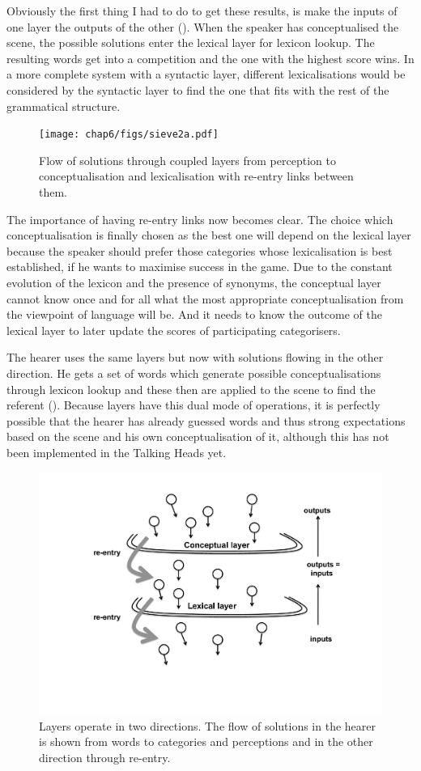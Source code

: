 Obviously the first thing I had to do to get 
these results, is make the inputs of one layer the
outputs of the other (). When the 
speaker has conceptualised the scene, the possible
solutions enter the lexical layer for lexicon lookup. 
The resulting words get into a competition and the 
one with the highest score wins. In a more complete
system with a syntactic layer, different lexicalisations
would be considered by the syntactic layer to find 
the one that fits with the rest of the grammatical 
structure. 


\begin{figure}[htbp]
  \centerline{\texttt{[image: chap6/figs/sieve2a.pdf]}}
\caption{\label{sieve2a}Flow of solutions through 
coupled layers from perception to conceptualisation and lexicalisation with re-entry links between them.} 
\end{figure}

The importance of having re-entry links now becomes
clear. The choice which conceptualisation is finally chosen 
as the best one will depend on the lexical layer because 
the speaker should prefer those categories whose 
lexicalisation is best established, if he wants to 
maximise success in the game. Due to the constant evolution
of the lexicon and the presence of synonyms, the conceptual
layer cannot know once and for all what the most
appropriate conceptualisation from the viewpoint of 
language will be. And it needs to know the outcome of the
lexical layer to later update the scores of participating
categorisers. 

The hearer uses the same layers but now with solutions
flowing in the other direction. He gets a set of words
which generate possible conceptualisations through 
lexicon lookup and these then are applied to the 
scene to find the referent (). Because 
layers have this dual mode of operations, it is perfectly 
possible that the hearer has already guessed words and 
thus strong expectations based on the scene and his 
own conceptualisation of it, although this has not been \enlargethispage{1\baselineskip}
implemented in the Talking Heads yet. 


\begin{figure}[htbp]
  \centerline{\includegraphics[width=.65\textwidth]{chap6/figs/sieve2b.pdf}}
\caption{\label{sieve2b}Layers operate in two 
directions. The flow of solutions in the hearer is shown from words to categories and perceptions
and in the other direction through re-entry.}
\end{figure}

